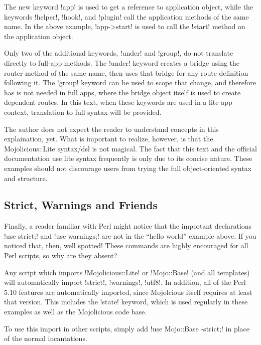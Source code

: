 The new keyword \lstmojolite!app! is used to get a reference to application object, 
while the keywords \lstmojolite!helper!, \lstmojolite!hook!, and \lstmojolite!plugin! call the application methods of the same name.
In the above example, \lstmojolite!app->start! is used to call the \lstperl!start! method on the application object.

Only two of the additional keywords, \lstmojolite!under! and \lstmojolite!group!, do not translate directly to full-app methods.
The \lstmojolite!under! keyword creates a bridge using the router method of the same name, 
then uses that bridge for any route definition following it.
The \lstmojolite!group! keyword can be used to scope that change, and therefore has is not needed in full apps, 
where the bridge object itself is used to create dependent routes.
In this text, when these keywords are used in a lite app context, translation to full syntax will be provided.

The author does not expect the reader to understand concepts in this explaination, yet.
What is important to realize, however, is that the Mojolicious::Lite syntax/dsl is not magical.
The fact that this text and the official documentation use lite syntax frequently is only due to its concise nature.
These examples should not discourage users from trying the full object-oriented syntax and structure.

\subsection{Strict, Warnings and Friends}

Finally, a reader familiar with Perl might notice that the important declarations \lstperl!use strict;! 
and \lstperl!use warnings;! are not in the ``hello world'' example above.
If you noticed that, then, well spotted!
These commands are highly encouraged for all Perl scripts, so why are they absent?

Any script which imports \lstperl!Mojolicious::Lite! or \lstperl!Mojo::Base! (and all templates) will automatically import 
\lstperl!strict!, \lstperl!warnings!, \lstperl!utf8!.
In addition, all of the Perl 5.10 features are automatically imported, since Mojolcious itself requires at least that version.
This includes the \lstperl!state! keyword, which is used regularly in these examples as well as the Mojolicious code base.

To use this import in other scripts, simply add \lstperl!use Mojo::Base -strict;! in place of the normal incantations.
